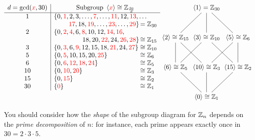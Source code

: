 \begin{example}{}{}
\begin{enumerate}
\[\begin{array}[t]{c|l@{\,}l}
				d=\gcd(\textcolor{red}{x},30) & \multicolumn{2}{c}{\text{Subgroup } \ip{\textcolor{red}{x}}\cong\Z_{\frac{30}d}} \\\hline
				1 & \{0,\textcolor{red}{1},2,3,\ldots,\textcolor{red}{7},\ldots,\textcolor{red}{11},12,\textcolor{red}{13},\makebox[0cm][l]{$\ldots$} \hfill\\
				& \hfill\textcolor{red}{17},18,\textcolor{red}{19},\ldots,\textcolor{red}{23},\ldots,\textcolor{red}{29}\} &=\Z_{30}\\
				2 & \{0,\textcolor{red}{2},\textcolor{red}{4},6,\textcolor{red}{8},10,12,\textcolor{red}{14},\textcolor{red}{16},\hfill\\
				& \hfill 18,20,\textcolor{red}{22},24,\textcolor{red}{26},\textcolor{red}{28}\} &\cong\Z_{15}\\
				3 & \{0,\textcolor{red}{3},6,\textcolor{red}{9},12,15,18,\textcolor{red}{21},24,\textcolor{red}{27}\}  &\cong\Z_{10}\\
				5 & \{0,\textcolor{red}{5},10,15,20,\textcolor{red}{25}\} &\cong\Z_{6}\\
				6 & \{0,\textcolor{red}{6},\textcolor{red}{12},\textcolor{red}{18},\textcolor{red}{24}\}  &\cong\Z_{5}\\
				10 & \{0,\textcolor{red}{10},\textcolor{red}{20}\} &\cong\Z_{3}\\
				15 & \{0,\textcolor{red}{15}\} &\cong\Z_{2}\\
				30 & \{\textcolor{red}{0}\} &\cong\Z_{1}
	   \end{array}
	   \hfill
	   \xymatrix @C0pt @R30pt{%
			 	& \ip{1}=\Z_{30} \ar@{-}[dl] \ar@{-}[d] \ar@{-}[dr] & \\
				\ip{2}\cong \Z_{15} \ar@{-}[d] \ar@{-}[dr] & \ip{3}\cong\Z_{10} \ar@{-}[dl] \ar@{-}[dr] & \ip{5}\cong\Z_6 \ar@{-}[d] \ar@{-}[dl] \\
				\ip{6}\cong\Z_5 \ar@{-}[dr] & \ip{10}\cong \Z_{3} \ar@{-}[d] & \ip{15}\cong\Z_2 \ar@{-}[dl] \\
	 & \ip{0}\cong\Z_1 &
	 		}
	 		\hspace{-4pt}
	  \]
  \end{enumerate}
  
  You should consider how the \emph{shape} of the subgroup diagram for $\mathbb{Z}_n$ depends on the \emph{prime decomposition} of $n$: for instance, each prime appears exactly once in $30=2\cdot 3\cdot 5$.
\end{example}


\goodbreak


